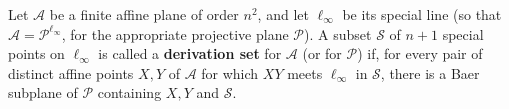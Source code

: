 Let $\mathcal{A}$ be a finite affine plane of order $n^2$, and let $\ell_{\infty}$ be its special line (so that $\mathcal{A} = \mathcal{P}^{\ell_{\infty}}$, for the appropriate projective plane $\mathcal{P}$). A subset $\mathcal{S}$ of $n+1$ special points on $\ell_{\infty}$ is called a \textbf{derivation set} for $\mathcal{A}$ (or for $\mathcal{P}$) if, for every pair of distinct affine points $X, Y$ of $\mathcal{A}$ for which $XY$ meets $\ell_{\infty}$ in $\mathcal{S}$, there is a Baer subplane of $\mathcal{P}$ containing $X, Y$ and $\mathcal{S}$.
